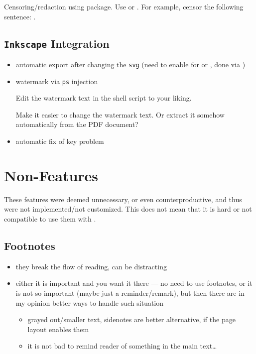 Censoring/redaction using  package.
Use \macro{\censor} or \macro{\censorbox}.
For example, censor the following sentence: .

\subsection{\texorpdfstring{\texttt{Inkscape}}{Inkscape} Integration}%
\label{sub:Inkscape Integration}

\begin{itemize}
    \item automatic export after changing the \texttt{svg} (need to enable  for  or , done via )
    \item watermark via \texttt{ps} injection
          \begin{remark}
              Edit the watermark text in the shell script  to your liking.
          \end{remark}
          \begin{Todo}
              Make it easier to change the watermark text.
              Or extract it somehow automatically from the PDF document?
          \end{Todo}
    \item automatic fix of  key problem
\end{itemize}


\section{Non-Features}%
\label{sec:Non-Features}

These features were deemed unnecessary, or even counterproductive, and thus were not implemented/not customized.
This does not mean that it is hard or not compatible to use them with \TeXtured{}.

\subsection{Footnotes}%
\label{sub:Footnotes}

\begin{itemize}
    \item they break the flow of reading, can be distracting
    \item either it is important and you want it there --- no need to use footnotes,
          or it is not so important (maybe just a reminder/remark), but then there
          are in my opinion better ways to handle such situation
          \begin{itemize}
              \item grayed out/smaller text, sidenotes are better alternative, if the page layout enables them
              \item it is not bad to remind reader of something in the main text\ldots
          \end{itemize}
\end{itemize}

